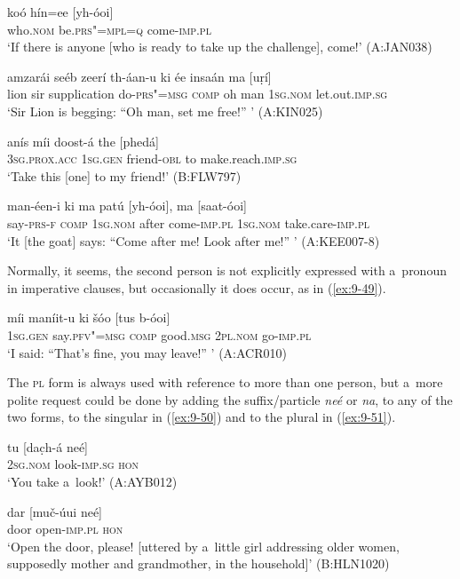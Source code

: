 \begin{exe}
\ex
\label{ex:9-45}
\gll koó hín=ee [yh-óoi]  \\
who.\textsc{nom} be.\textsc{prs"=mpl=q} come-\textsc{imp.pl}  \\
\glt `If there is anyone [who is ready to take up the challenge], come!' (A:JAN038)

\ex
\label{ex:9-46}
\gll amzarái seéb zeerí th-áan-u ki ée insaán ma [uṛí] \\
lion sir supplication do-\textsc{prs"=msg} \textsc{comp} oh  man \textsc{1sg.nom} let.out.\textsc{imp.sg}\\
\glt `Sir Lion is begging: ``Oh man, set me free!'' ' (A:KIN025)

\ex
\label{ex:9-47}
\gll anís míi doost-á the [phedá] \\
\textsc{3sg.prox.acc} \textsc{1sg.gen} friend-\textsc{obl} to make.reach.\textsc{imp.sg} \\
\glt `Take this [one] to my friend!' (B:FLW797)

\ex
\label{ex:9-48}
\gll man-éen-i ki ma patú [yh-óoi], ma [saat-óoi] \\
say-\textsc{prs-f} \textsc{comp} \textsc{1sg.nom} after come-\textsc{imp.pl} \textsc{1sg.nom} take.care-\textsc{imp.pl} \\
\glt `It [the goat] says: ``Come after me! Look after me!'' ' (A:KEE007-8)
\end{exe}

Normally, it seems, the second person is not explicitly expressed with a~pronoun in imperative clauses, but occasionally it does occur, as in (\ref{ex:9-49}).

\begin{exe}
\ex
\label{ex:9-49}
\gll míi maníit-u ki šóo [tus b-óoi] \\
\textsc{1sg.gen} say.\textsc{pfv"=msg} \textsc{comp} good.\textsc{msg} \textsc{2pl.nom} go-\textsc{imp.pl} \\
\glt `I said: ``That's fine, you may leave!'' ' (A:ACR010)
\end{exe}

The \textsc{pl} form is always used with reference to more than one person, but a~more polite request could be done by adding the suffix/particle \textit{neé} or \textit{na}, to any of the two forms, to the singular in (\ref{ex:9-50}) and to the plural in (\ref{ex:9-51}).

\begin{exe}
\ex
\label{ex:9-50}
\gll tu [dac̣h-á neé] \\
\textsc{2sg.nom} look-\textsc{imp.sg} \textsc{hon}  \\
\glt `You take a~look!' (A:AYB012)

\ex
\label{ex:9-51}
\gll dar [muč-úui neé] \\
door open-\textsc{imp.pl} \textsc{hon} \\
\glt `Open the door, please! [uttered by a~little girl addressing older women, supposedly mother and grandmother, in the household]' (B:HLN1020)
\end{exe}

